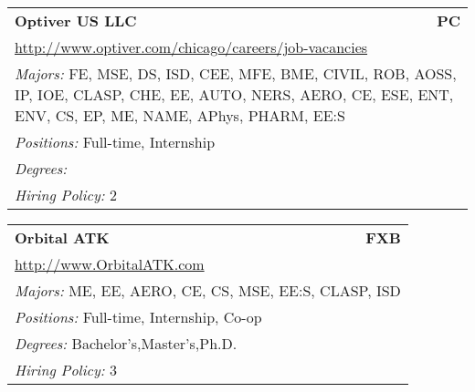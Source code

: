 \documentclass[twoside]{article}
\begin{document}
\begin{center}
\begin{multicols}{3}
\begin{FlushLeft}
\begin{minipage}{\columnwidth}
\end{minipage}
 
\begin{minipage}{\columnwidth}\begin{tabularx}{.95\columnwidth}{Xr}
                 {\Large\bf Optiver US LLC} & {\Large\bf PC}\\
    \multicolumn{2}{p{.95\columnwidth}}{\url{http://www.optiver.com/chicago/careers/job-vacancies}}\\
    \multicolumn{2}{p{.95\columnwidth}}{\emph{Majors:} FE, MSE, DS, ISD, CEE, MFE, BME, CIVIL, ROB, AOSS, IP, IOE, CLASP, CHE, EE, AUTO, NERS, AERO, CE, ESE, ENT, ENV, CS, EP, ME, NAME, APhys, PHARM, EE:S}\\
    \multicolumn{2}{p{.95\columnwidth}}{\emph{Positions:} Full-time, Internship}\\
    \multicolumn{2}{p{.95\columnwidth}}{\emph{Degrees:} }\\
    \multicolumn{2}{p{.95\columnwidth}}{\emph{Hiring Policy:} 2}\\
    \end{tabularx}
    
\end{minipage}
 
\begin{minipage}{\columnwidth}\begin{tabularx}{.95\columnwidth}{Xr}
                 {\Large\bf Orbital ATK} & {\Large\bf FXB}\\
    \multicolumn{2}{p{.95\columnwidth}}{\url{http://www.OrbitalATK.com}}\\
    \multicolumn{2}{p{.95\columnwidth}}{\emph{Majors:} ME, EE, AERO, CE, CS, MSE, EE:S, CLASP, ISD}\\
    \multicolumn{2}{p{.95\columnwidth}}{\emph{Positions:} Full-time, Internship, Co-op}\\
    \multicolumn{2}{p{.95\columnwidth}}{\emph{Degrees:} Bachelor's,Master's,Ph.D.}\\
    \multicolumn{2}{p{.95\columnwidth}}{\emph{Hiring Policy:} 3}\\
    \end{tabularx}
    
\end{minipage}
 

\end{FlushLeft}
\end{multicols}
\end{center}
\end{document}

